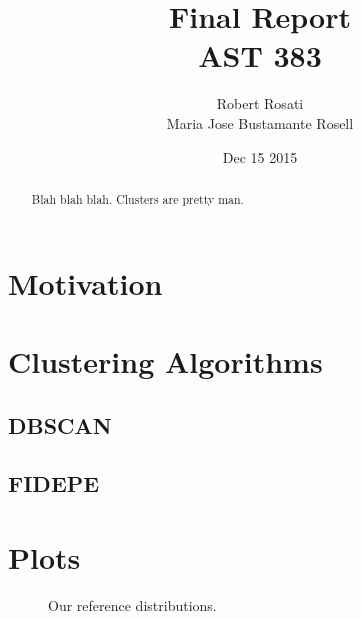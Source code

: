 \documentclass[12pt]{article}
\begin{document}
\singlespacing
\title{Final Report\\
AST 383}
\date{Dec 15 2015}
\author{Robert Rosati \\ Maria Jose Bustamante Rosell}
\maketitle

\begin{abstract}
\par Blah blah blah. Clusters are pretty man.
\end{abstract}

\doublespacing
\section{Motivation}

\section{Clustering Algorithms}

\subsection{DBSCAN}

\subsection{FIDEPE}

\section{Plots}

\begin{figure}[ht]
\centering
\caption{Our reference distributions.}
\label{fig:reference}
\end{figure}
\end{document}
